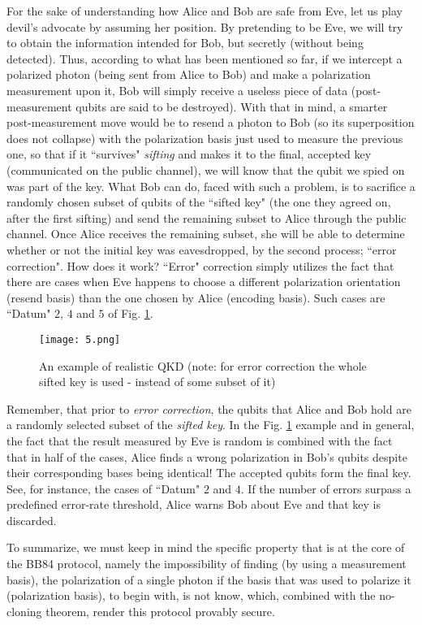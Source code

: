 For the sake of understanding how Alice and Bob are safe from Eve, let us play devil's advocate 
by assuming her position.
By pretending to be Eve, we will try to obtain the information intended for
Bob, but secretly (without being detected). 
Thus, according to what has been mentioned so far, if we intercept a polarized photon 
(being sent from Alice to Bob) and make a polarization measurement upon it, Bob will
simply receive a useless piece of data (post-measurement qubits are said to be destroyed).
With that in mind, a smarter post-measurement move would be to resend a photon 
to Bob (so its superposition does not collapse) with the polarization basis 
just used to measure the previous one, so that if it ``survives" {\it sifting} and makes it 
to the final, accepted key (communicated on the public channel), we will know that the qubit 
we spied on was part of the key.
What Bob can do, faced with such a problem, is to sacrifice a randomly chosen subset of
qubits of the ``sifted key" (the one they agreed on, after the first sifting) and
send the remaining subset to Alice through the public channel. Once Alice receives the
remaining subset, she will be able to determine whether or not the initial key was
eavesdropped, by the second process; ``error correction".
How does it work?
``Error" correction simply utilizes the fact that there are cases when Eve
happens to choose a different polarization orientation (resend basis) than the one chosen
by Alice (encoding basis). Such cases are ``Datum" $2$, $4$ and $5$ of Fig. \ref{fig5}.
\begin{figure}[!h]
\centerline{\texttt{[image: 5.png]}}
\caption{An example of realistic QKD (note: for error correction the whole sifted key is used - instead of some subset of it)}
\label{fig5}
\end{figure}
Remember, that prior to {\it error correction}, the qubits that Alice and Bob hold are a randomly selected 
subset of the {\it sifted key}.
In the Fig. \ref{fig5} example and in general, the fact that the result measured by Eve is random is combined
with the fact that in half of the cases, Alice finds a wrong polarization in Bob's qubits
despite their corresponding bases being identical!
The accepted qubits form the final key.
See, for instance, the cases of ``Datum" $2$ and $4$.
If the number of errors surpass a predefined error-rate threshold, Alice warns Bob about Eve and that key is discarded.

To summarize, we must keep in mind the specific property that is at the core of the BB84
protocol, namely the impossibility of finding (by using a measurement basis), 
the polarization of a single photon if the basis that was used to polarize it (polarization basis), 
to begin with, is not know, which, combined with the no-cloning theorem, render this protocol provably secure.
